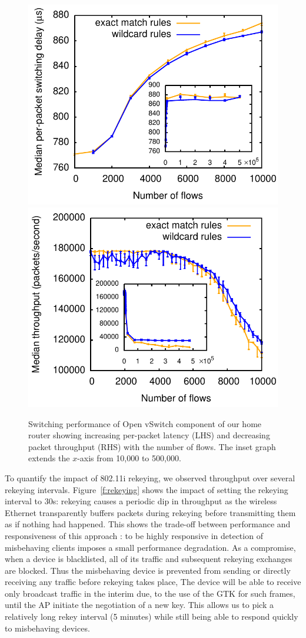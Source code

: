 \begin{figure} \centering
  \includegraphics[width=0.49\columnwidth]{switching-delay}
  \includegraphics[width=0.49\columnwidth]{throughput}
  \caption{\label{f:performance}Switching performance of Open vSwitch component
    of our home router showing increasing per-packet latency (LHS) and
    decreasing packet throughput (RHS) with the number of flows.  The inset
    graph extends the $x$-axis from 10,000 to 500,000.}
\end{figure}

To quantify the impact of 802.11i rekeying, we observed throughput over several
rekeying intervals.  Figure~\ref{f:rekeying} shows the impact of setting the
rekeying interval to 30s: rekeying causes a periodic dip in throughput as the
wireless Ethernet transparently buffers packets during rekeying before
transmitting them as if nothing had happened.  This shows the trade-off between
performance and responsiveness of this approach
: to be highly responsive in detection of misbehaving clients imposes a small
performance degradation.  
As a compromise, when a device is blacklisted, all of its traffic and subsequent
rekeying exchanges are blocked.
Thus the misbehaving device is prevented from sending or directly receiving any
traffic before rekeying takes place, 
The device will be able to receive only broadcast traffic in the interim due, to
the use of the GTK for such frames, until the AP initiate the negotiation of a
new key.  
This allows us to pick a relatively long rekey interval (5 minutes) while
still being able to respond quickly to misbehaving devices.

